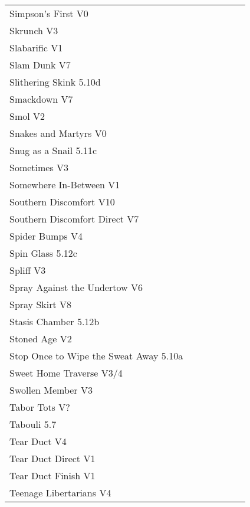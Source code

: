\begin{flushleft}
\begin{center}
\begin{supertabular}{p{0.76\linewidth}p{0.08\linewidth}}
Simpson's First V0 & \pageref{rt:Simpson's First} \\
Skrunch V3 & \pageref{rt:Skrunch} \\
Slabarific V1 & \pageref{rt:Slabarific} \\
Slam Dunk V7 & \pageref{rt:Slam Dunk} \\
Slithering Skink 5.10d & \pageref{rt:Slithering Skink} \\
Smackdown V7 & \pageref{rt:Smackdown} \\
Smol V2 & \pageref{rt:Smol} \\
Snakes and Martyrs V0 & \pageref{rt:Snakes and Martyrs} \\
Snug as a Snail 5.11c & \pageref{rt:Snug as a Snail} \\
Sometimes V3 & \pageref{rt:Sometimes} \\
Somewhere In-Between V1 & \pageref{rt:Somewhere In-Between} \\
Southern Discomfort V10 & \pageref{rt:Southern Discomfort} \\
Southern Discomfort Direct V7 & \pageref{vr:Southern Discomfort Direct} \\
Spider Bumps V4 & \pageref{rt:Spider Bumps} \\
Spin Glass 5.12c & \pageref{rt:Spin Glass} \\
Spliff V3 & \pageref{rt:Spliff} \\
Spray Against the Undertow V6 & \pageref{vr:Spray Against the Undertow} \\
Spray Skirt V8 & \pageref{rt:Spray Skirt} \\
Stasis Chamber 5.12b & \pageref{rt:Stasis Chamber} \\
Stoned Age V2 & \pageref{rt:Stoned Age} \\
Stop Once to Wipe the Sweat Away 5.10a & \pageref{rt:Stop Once to Wipe the Sweat Away} \\
Sweet Home Traverse V3/4 & \pageref{vr:Sweet Home Traverse} \\
Swollen Member V3 & \pageref{rt:Swollen Member} \\
Tabor Tots V? & \pageref{vr:Tabor Tots} \\
Tabouli 5.7 & \pageref{rt:Tabouli} \\
Tear Duct V4 & \pageref{rt:Tear Duct} \\
Tear Duct Direct V1 & \pageref{vr:Tear Duct Direct} \\
Tear Duct Finish V1 & \pageref{rt:Tear Duct Finish} \\
Teenage Libertarians V4 & \pageref{rt:Teenage Libertarians} \\

\end{supertabular}
\end{center}
\end{flushleft}
